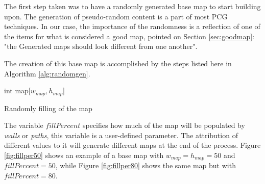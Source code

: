 The first step taken was to have a randomly generated base map to start building upon. The generation of pseudo-random content is a part of most PCG techniques. In our case, the importance of the randomness is a reflection of one of the items for what is considered a good map, pointed on Section \ref{sec:goodmap}: "the Generated maps should look different from one another".

The creation of this base map is accomplished by the steps listed here in Algorithm \ref{alg:randomgen}.


\begin{algorithm}[h] 
 \DontPrintSemicolon
 int map[\(w_{map},h_{map}\)]\;
 \caption{Randomly filling of the map}\label{alg:randomgen}
\end{algorithm} 

The variable \(fillPercent\) specifies how much of the map will be populated by \emph{walls} or \emph{paths}, this variable is a user-defined parameter. The attribution of different values to it will generate different maps at the end of the process. Figure \ref{fig:fillper50} shows an example of a base map with \(w_{map} = h_{map} = 50\) and  \(fillPercent = 50\), while Figure \ref{fig:fillper80} shows the same map but with \(fillPercent = 80\).

